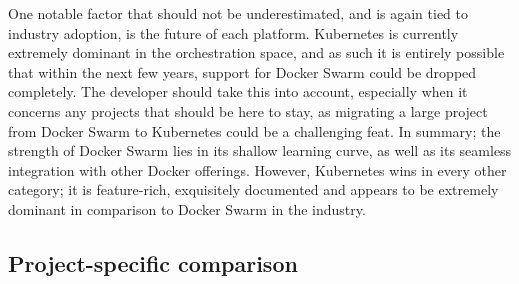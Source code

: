 \documentclass[thesis=B,english]{FITthesis}[2019/12/23]
\begin{document}
\newline
One notable factor that should not be underestimated, and is again tied to industry adoption, is the future of each platform. Kubernetes is currently extremely dominant in the orchestration space, and as such it is entirely possible that within the next few years, support for Docker Swarm could be dropped completely. The developer should take this into account, especially when it concerns any projects that should be here to stay, as migrating a large project from Docker Swarm to Kubernetes could be a challenging feat.
\newline
In summary; the strength of Docker Swarm lies in its shallow learning curve, as well as its seamless integration with other Docker offerings. However, Kubernetes wins in every other category; it is feature-rich, exquisitely documented and appears to be extremely dominant in comparison to Docker Swarm in the industry.

\subsection{Project-specific comparison}
\end{document}

